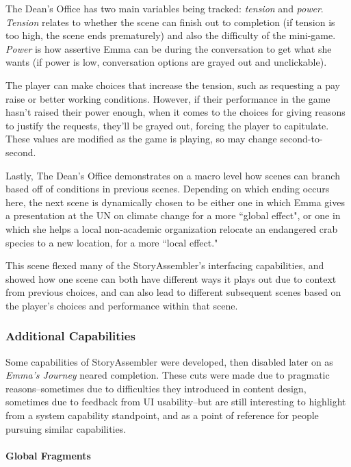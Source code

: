 The Dean's Office has two main variables being tracked: \textit{tension} and \textit{power}. \textit{Tension} relates to whether the scene can finish out to completion (if tension is too high, the scene ends prematurely) and also the difficulty of the mini-game. \textit{Power} is how assertive Emma can be during the conversation to get what she wants (if power is low, conversation options are grayed out and unclickable).

The player can make choices that increase the tension, such as requesting a pay raise or better working conditions. However, if their performance in the game hasn't raised their power enough, when it comes to the choices for giving reasons to justify the requests, they'll be grayed out, forcing the player to capitulate. These values are modified as the game is playing, so may change second-to-second.

Lastly, The Dean’s Office demonstrates on a macro level how scenes can branch based off of conditions in previous scenes. Depending on which ending occurs here, the next scene is dynamically chosen to be either one in which Emma gives a presentation at the UN on climate change for a more ``global effect", or one in which she helps a local non-academic organization relocate an endangered crab species to a new location, for a more ``local effect."

This scene flexed many of the StoryAssembler's interfacing capabilities, and showed how one scene can both have different ways it plays out due to context from previous choices, and can also lead to different subsequent scenes based on the player's choices and performance within that scene.


\subsubsection{Additional Capabilities}

Some capabilities of StoryAssembler were developed, then disabled later on as \textit{Emma's Journey} neared completion. These cuts were made due to pragmatic reasons--sometimes due to difficulties they introduced in content design, sometimes due to feedback from UI usability--but are still interesting to highlight from a system capability standpoint, and as a point of reference for people pursuing similar capabilities.

\paragraph{Global Fragments}
\label{sa-global-fragments}

